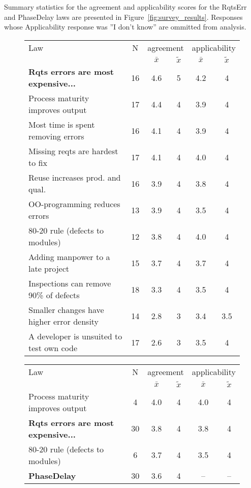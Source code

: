 Summary statistics for the agreement and applicability scores for the RqtsErr and PhaseDelay laws are presented in Figure~\ref{fig:survey_results}. Responses whose Applicability response was ''I don't know'' are ommitted from analysis.


\begin{figure}[!ht] 
\scriptsize
\begin{center}
\begin{tabular}{l|c|c|c|c|c}
Law & N & \multicolumn{2}{c}{agreement} & \multicolumn{2}{c}{applicability} \\ 
 & & $\bar{x}$ & $\tilde{x}$ & $\bar{x}$ & $\tilde{x}$ \\
\hline 
\textbf{Rqts errors are most expensive...} & 16 & 4.6 & 5 & 4.2 & 4 \\ 
Process maturity improves output & 17 & 4.4 & 4 & 3.9 & 4 \\ 
Most time is spent removing errors & 16 & 4.1 & 4 & 3.9 & 4 \\ 
Missing reqts are hardest to fix & 17 & 4.1 & 4 & 4.0 & 4 \\
Reuse increases prod. and qual. & 16 & 3.9 & 4 & 3.8 & 4 \\
OO-programming reduces errors & 13 & 3.9 & 4 & 3.5 & 4 \\
80-20 rule (defects to modules) & 12 & 3.8 & 4 & 4.0 & 4 \\
Adding manpower to a late project & 15 & 3.7 & 4 & 3.7 & 4 \\
Inspections can remove 90\% of defects & 18 & 3.3 & 4 & 3.5 & 4 \\
Smaller changes have higher error density & 14 & 2.8 & 3 & 3.4 & 3.5 \\
A developer is unsuited to test own code & 17 & 2.6 & 3 & 3.5 & 4
\end{tabular} 
\bigskip
{}
\begin{tabular}{l|c|c|c|c|c}
Law & N & \multicolumn{2}{c}{agreement} & \multicolumn{2}{c}{applicability} \\ 
 & & $\bar{x}$ & $\tilde{x}$ & $\bar{x}$ & $\tilde{x}$ \\
\hline 
Process maturity improves output & 4 & 4.0 & 4 & 4.0 & 4 \\
\textbf{Rqts errors are most expensive...} & 30 & 3.8 & 4 & 3.8 & 4   \\ 
80-20 rule (defects to modules) & 6 & 3.7 & 4 & 3.5 & 4 \\
\textbf{PhaseDelay} & 30 & 3.6 & 4 & -- & --  \\ 

\end{tabular}
\end{center}
\end{figure}
